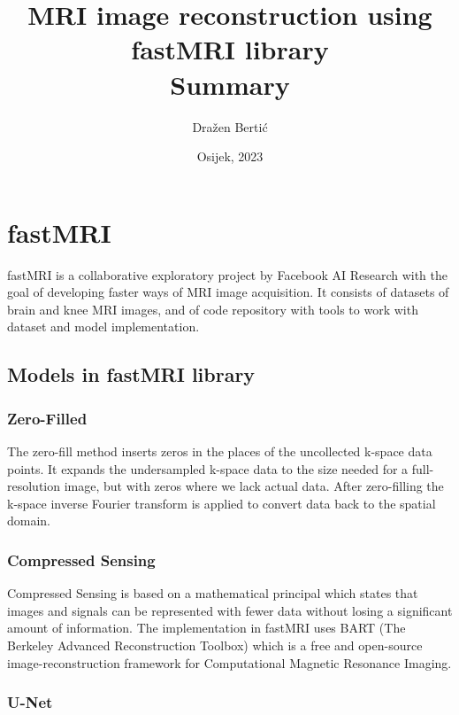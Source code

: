 \documentclass[10pt,a4paper]{article}
\begin{document}
\title{MRI image reconstruction using fastMRI library \\ \vspace{0.5cm} \large Summary}
\author{Dražen Bertić}
\date{Osijek, 2023} %

\maketitle

\section{fastMRI}

fastMRI is a collaborative exploratory project by Facebook AI Research with the goal of developing faster ways of MRI image acquisition. It consists of datasets of brain and knee MRI images, and of code repository with tools to work with dataset and model implementation. \cite{zbontar2019fastmri}

\subsection{Models in fastMRI library}

\subsubsection{Zero-Filled}

The zero-fill method inserts zeros in the places of the uncollected k-space data points. It expands the undersampled k-space data to the size needed for a full-resolution image, but with zeros where we lack actual data. After zero-filling the k-space inverse Fourier transform is applied to convert data back to the spatial domain.

\subsubsection{Compressed Sensing}

Compressed Sensing is based on a mathematical principal which states that images and signals can be represented with fewer data without losing a significant amount of information. The implementation in fastMRI uses BART (The Berkeley Advanced Reconstruction Toolbox) which is a free and open-source image-reconstruction framework for Computational Magnetic Resonance Imaging. 

\subsubsection{U-Net}
\end{document}
